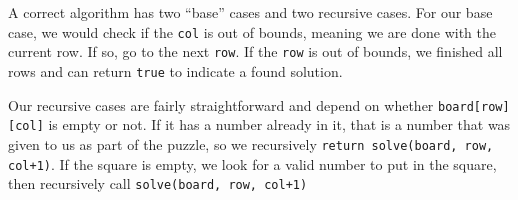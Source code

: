 A correct algorithm has two ``base'' cases and two recursive cases. For our base case, we would check if the \texttt{col} is out of bounds, meaning we are done with the current row.  If so, go to the next \texttt{row}.  If the \texttt{row} is out of bounds, we finished all rows and can return \texttt{true} to indicate a found solution.

Our recursive cases are fairly straightforward and depend on whether \texttt{board[row][col]} is empty or not.  If it has a number already in it, that is a number that was given to us as part of the puzzle, so we recursively \texttt{return solve(board, row, col+1)}.  If the square is empty, we look for a valid number to put in the square, then recursively call \texttt{solve(board, row, col+1)}








%
%
%
%
%
%
%

